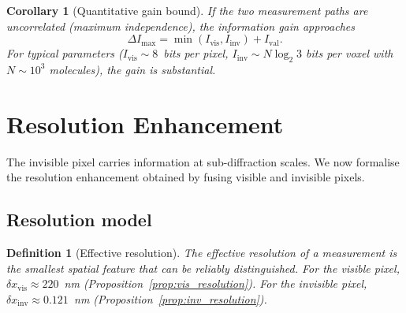 \documentclass[11pt,twocolumn,a4paper]{article}
\newtheorem{corollary}[theorem]{Corollary}
\newtheorem{definition}{Definition}
\begin{document}
\begin{corollary}[Quantitative gain bound]\label{cor:gain_bound}
If the two measurement paths are uncorrelated (maximum independence), the information gain approaches
\begin{equation}
\Delta I_{\max} = \min(I_{\mathrm{vis}}, I_{\mathrm{inv}}) + I_{\mathrm{val}}.
\end{equation}
For typical parameters ($I_{\mathrm{vis}} \sim 8$~bits per pixel, $I_{\mathrm{inv}} \sim N\log_2 3$ bits per voxel with $N \sim 10^3$ molecules), the gain is substantial.
\end{corollary}


\section{Resolution Enhancement}\label{sec:resolution}

The invisible pixel carries information at sub-diffraction scales.
We now formalise the resolution enhancement obtained by fusing visible and invisible pixels.

\subsection{Resolution model}

\begin{definition}[Effective resolution]\label{def:eff_resolution}
The effective resolution of a measurement is the smallest spatial feature that can be reliably distinguished.
For the visible pixel, $\delta x_{\mathrm{vis}} \approx 220$~nm (Proposition~\ref{prop:vis_resolution}).
For the invisible pixel, $\delta x_{\mathrm{inv}} \approx 0.121$~nm (Proposition~\ref{prop:inv_resolution}).
\end{definition}
\end{document}
